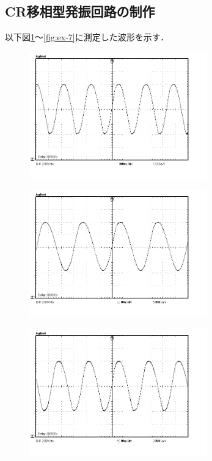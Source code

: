 \documentclass[10pt, a4j, dvipdfmx]{jarticle}
\makeatletter
\newcommand{\figcaption}[1]{\def\@captype{figure}\caption{#1}}
\makeatother
\begin{document}
      \subsection{CR移相型発振回路の制作}
      以下図\ref{fig:ex-2}〜\ref{fig:ex-7}に測定した波形を示す．
      \begin{figure}[H]
        \centering
        \includegraphics[height=55mm]{104.bmp}
        \figcaption{}
        \label{fig:ex-2}
      \end{figure}
      \begin{figure}[H]
        \centering
        \includegraphics[height=55mm]{222.bmp}
        \figcaption{}
        \label{fig:ex-3}
      \end{figure}
      \begin{figure}[H]
        \centering
        \includegraphics[height=55mm]{472.bmp}
        \figcaption{}
        \label{fig:ex-4}
      \end{figure}
\end{document}
